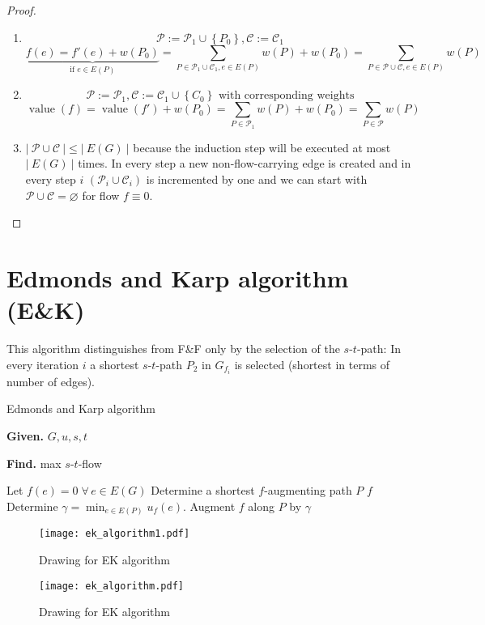 \documentclass{article}
\newcommand{\card}[1]{\left|\:\!#1\:\!\right|}
\newcommand{\set}[1]{\left\{#1\right\}}
\newcommand{\given}[1]{\textbf{Given.} #1\par}
\newcommand{\find}[1]{\textbf{Find.} #1\par}
\newcommand{\gath}[2]{$#1$-$#2$-path} %
\newcommand{\flow}[2]{$#1$-$#2$-flow}
\newcommand{\fall}{\;\forall\,}
\begin{document}
\begin{proof}
  \begin{enumerate}
    \item
      \[
        \mathcal{P} := \mathcal{P}_1 \cup \set{P_0}, \mathcal{C} := \mathcal{C_1}
      \] \[
        \underbrace{f(e) = f'(e) + w(P_0)}_{\text{if } e \in E(P)}
          = \sum_{P \in \mathcal{P}_1 \cup \mathcal{C}_1, e \in E(P)} w(P) + w(P_0)
          = \sum_{P \in \mathcal{P} \cup \mathcal{C}, e \in E(P)} w(P)
      \]
    \item
      \[
        \mathcal{P} := \mathcal{P}_1, \mathcal{C}
          := \mathcal{C_1} \cup \set{C_0} \text{ with corresponding weights}
      \] \[
        \operatorname{value}(f) = \operatorname{value}(f') + w(P_0)
          = \sum_{P \in \mathcal{P}_1} w(P) + w(P_0)
          = \sum_{P \in \mathcal{P}} w(P)
      \]
    \item
      $\card{\mathcal{P} \cup \mathcal{C}} \leq \card{E(G)}$ because the induction step will be executed at most $\card{E(G)}$ times. In every step a new non-flow-carrying edge is created and in every step $i$ $(\mathcal{P}_i \cup \mathcal{C}_i)$ is incremented by one and we can start with $\mathcal{P} \cup \mathcal{C} = \diameter$ for flow $f \equiv 0$.
  \end{enumerate}
\end{proof}

\section[Edmonds and Karp algorithm]{Edmonds and Karp algorithm (E\&K)}
\label{ch-4.3}
%
This algorithm distinguishes from F\&F only by the selection of the \gath st: In every iteration $i$ a shortest \gath st $P_2$ in $G_{f_i}$ is selected (shortest in terms of number of edges).

\begin{algorithm}
  \caption{Edmonds and Karp algorithm}
  \label{ek-algo}
  \given{$G, u, s, t$}
  \find{max \flow st}
\begin{algorithmic}[1]
  \State Let $f(e) = 0 \fall e \in E(G)$
  \State Determine a shortest $f$-augmenting path $P$
    \label{ek-step-redo}
    \State \Return $f$
  \EndIf
  \State
    Determine $\gamma = \min_{e \in E(P)} u_f(e)$.
    Augment $f$ along $P$ by $\gamma$
  \State {}
\end{algorithmic}
\end{algorithm}

\begin{figure}[!h]
 \begin{center}
  \texttt{[image: ek\_algorithm1.pdf]}
  \caption{Drawing for EK algorithm}
 \end{center}
 \begin{center}
  \texttt{[image: ek\_algorithm.pdf]}
  \caption{Drawing for EK algorithm}
 \end{center}
\end{figure}
\end{document}
